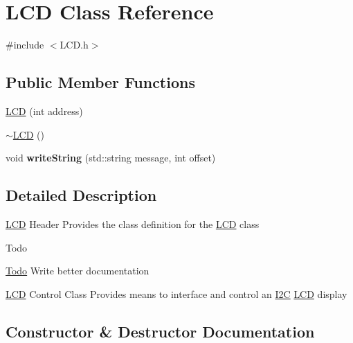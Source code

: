 \hypertarget{class_l_c_d}{}\section{L\+CD Class Reference}
\label{class_l_c_d}


{\ttfamily \#include $<$L\+C\+D.\+h$>$}

\subsection*{Public Member Functions}
\begin{DoxyCompactItemize}
\item 
\hyperlink{class_l_c_d_a135b836ed5faff064a86825535103842}{L\+CD} (int address)
\item 
\hyperlink{class_l_c_d_a5ac2667d164486b73b35dce3fd76bd95}{$\sim$\+L\+CD} ()
\item 
void {\bfseries write\+String} (std\+::string message, int offset)\hypertarget{class_l_c_d_ac94eaac935d9e6fbc766d67a12db2374}{}\label{class_l_c_d_ac94eaac935d9e6fbc766d67a12db2374}

\end{DoxyCompactItemize}


\subsection{Detailed Description}
\hyperlink{class_l_c_d}{L\+CD} Header Provides the class definition for the \hyperlink{class_l_c_d}{L\+CD} class \begin{DoxyRefDesc}{Todo}
\item[\hyperlink{todo__todo000002}{Todo}]Write better documentation \end{DoxyRefDesc}


\hyperlink{class_l_c_d}{L\+CD} Control Class Provides means to interface and control an \hyperlink{class_i2_c}{I2C} \hyperlink{class_l_c_d}{L\+CD} display 

\subsection{Constructor \& Destructor Documentation}
